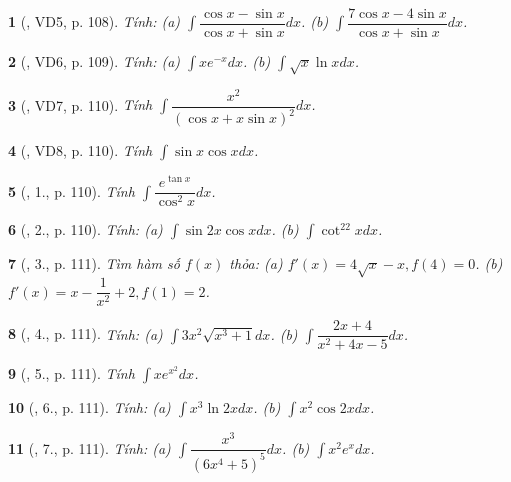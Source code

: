 \documentclass{article}
\newtheorem{baitoan}{}
\begin{document}
\begin{baitoan}[\cite{TLCT_giai_tich_12}, VD5, p. 108]
	Tính: (a) $\int \dfrac{\cos x - \sin x}{\cos x + \sin x}dx$. (b) $\int \dfrac{7\cos x - 4\sin x}{\cos x + \sin x}dx$.
\end{baitoan}

\begin{baitoan}[\cite{TLCT_giai_tich_12}, VD6, p. 109]
	Tính: (a) $\int xe^{-x}dx$. (b) $\int \sqrt{x}\ln xdx$.
\end{baitoan}

\begin{baitoan}[\cite{TLCT_giai_tich_12}, VD7, p. 110]
	Tính $\int \dfrac{x^2}{(\cos x + x\sin x)^2}dx$.
\end{baitoan}

\begin{baitoan}[\cite{TLCT_giai_tich_12}, VD8, p. 110]
	Tính $\int \sin x\cos xdx$.
\end{baitoan}

\begin{baitoan}[\cite{TLCT_giai_tich_12}, 1., p. 110]
	Tính $\int \dfrac{e^{\tan x}}{\cos^2x}dx$.
\end{baitoan}

\begin{baitoan}[\cite{TLCT_giai_tich_12}, 2., p. 110]
	Tính: (a) $\int \sin2x\cos xdx$. (b) $\int \cot^22xdx$.
\end{baitoan}

\begin{baitoan}[\cite{TLCT_giai_tich_12}, 3., p. 111]
	Tìm hàm số $f(x)$ thỏa: (a) $f'(x) = 4\sqrt{x} - x,f(4) = 0$. (b) $f'(x) = x - \dfrac{1}{x^2} + 2,f(1) = 2$.
\end{baitoan}

\begin{baitoan}[\cite{TLCT_giai_tich_12}, 4., p. 111]
	Tính: (a) $\int 3x^2\sqrt{x^3 + 1}dx$. (b) $\int \dfrac{2x + 4}{x^2 + 4x - 5}dx$.
\end{baitoan}

\begin{baitoan}[\cite{TLCT_giai_tich_12}, 5., p. 111]
	Tính $\int xe^{x^2}dx$.
\end{baitoan}

\begin{baitoan}[\cite{TLCT_giai_tich_12}, 6., p. 111]
	Tính: (a) $\int x^3\ln2xdx$. (b) $\int x^2\cos2xdx$.
\end{baitoan}

\begin{baitoan}[\cite{TLCT_giai_tich_12}, 7., p. 111]
	Tính: (a) $\int \dfrac{x^3}{(6x^4 + 5)^5}dx$. (b) $\int x^2e^xdx$.
\end{baitoan}
\end{document}
